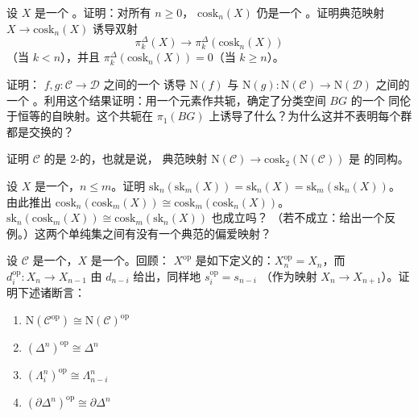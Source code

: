 \begin{exercise}\label{ex:coskeleton-kan}
设 $X$ 是一个 \trKanComplex{}。证明：对所有 $n \ge 0$，\trSimplicialSet{}%
$\mathrm{cosk}_n(X)$ 仍是一个 \trKanComplex{}。证明典范映射
$X \to \mathrm{cosk}_n(X)$ 诱导双射
\[
\pi^{\Delta}_k(X) \to \pi^{\Delta}_k(\mathrm{cosk}_n(X))
\]
（当 $k < n$），并且 $\pi^{\Delta}_k(\mathrm{cosk}_n(X)) = 0$（当 $k \ge n$）。
\end{exercise}

\begin{exercise}\label{ex:natural-transformation-homotopy}
证明：\trFunctor{} $f, g\colon \mathcal{C} \to \mathcal{D}$ 之间的一个%
\trNaturalTransformation{}诱导 $\mathrm{N}(f)$ 与
$\mathrm{N}(g)\colon \mathrm{N}(\mathcal{C}) \to \mathrm{N}(\mathcal{D})$ 之间的一个%
\trHomotopy{}。利用这个结果证明：用一个元素作共轭，确定了分类空间 $BG$ 的一个
同伦于恒等的自映射。这个共轭在 $\pi_1(BG)$ 上诱导了什么？为什么这并不表明每个群
都是交换的？
\end{exercise}

\begin{exercise}\label{ex:nerve-2-coskeletal}
证明\trCategory{} $\mathcal{C}$ 的\trNerve{}是 $2$-\trCoskeleton{}的，也就是说，
典范映射 $\mathrm{N}(\mathcal{C}) \to \mathrm{cosk}_2(\mathrm{N}(\mathcal{C}))$ 是%
\trSimplicialSet{}的同构。
\end{exercise}

\begin{exercise}\label{ex:skeleton-coskeleton-idempotent}
设 $X$ 是一个\trSimplicialSet{}，$n \le m$。证明
$\mathrm{sk}_n(\mathrm{sk}_m(X)) = \mathrm{sk}_n(X) = \mathrm{sk}_m(\mathrm{sk}_n(X))$。
由此推出 $\mathrm{cosk}_n(\mathrm{cosk}_m(X)) \cong \mathrm{cosk}_m(\mathrm{cosk}_n(X))$。
$\mathrm{sk}_n(\mathrm{cosk}_m(X)) \cong \mathrm{cosk}_m(\mathrm{sk}_n(X))$ 也成立吗？
（若不成立：给出一个反例。）这两个单纯集之间有没有一个典范的偏爱映射？
\end{exercise}

\begin{exercise}\label{ex:nerve-op}
设 $\mathcal{C}$ 是一个\trCategory{}，$X$ 是一个\trSimplicialSet{}。回顾：
$X^{\mathrm{op}}$ 是如下定义的\trSimplicialSet{}：$X^{\mathrm{op}}_n = X_n$，而
$d^{\mathrm{op}}_i\colon X_n \to X_{n-1}$ 由 $d_{n-i}$ 给出，同样地 $s^{\mathrm{op}}_i = s_{n-i}$
（作为映射 $X_n \to X_{n+1}$）。证明下述诸断言：
\begin{enumerate}[label=(\arabic*)]
  \item $\mathrm{N}(\mathcal{C}^{\mathrm{op}}) \cong \mathrm{N}(\mathcal{C})^{\mathrm{op}}$
  \item $(\Delta^n)^{\mathrm{op}} \cong \Delta^n$
  \item $(\Lambda^n_i)^{\mathrm{op}} \cong \Lambda^n_{n-i}$
  \item $(\partial\Delta^n)^{\mathrm{op}} \cong \partial\Delta^n$
\end{enumerate}
\end{exercise}

